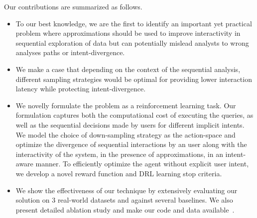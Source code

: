 Our contributions are summarized as follows.
\begin{itemize}
    \item To our best knowledge, we are the first to identify an important yet practical problem where approximations should be used to improve interactivity in sequential exploration of data but can potentially mislead analysts to wrong analyses paths or intent-divergence. 
    \item We make a case that depending on the context of the sequential analysis, different sampling strategies would be optimal for providing lower interaction latency while protecting intent-divergence.   
    \item We novelly formulate the problem as a reinforcement learning task. Our formulation captures both the computational cost of executing the queries, as well as the sequential decisions made by users for different implicit intents. We model the choice of down-sampling strategy as the action-space and optimize the divergence of sequential interactions by an user along with the interactivity of the system, in the presence of approximations, in an intent-aware manner.
    To efficiently optimize the agent without explicit user intent, we develop a novel reward function and DRL learning stop criteria.
    \item We show the effectiveness of our technique by extensively evaluating our solution on 3 real-world datasets and against several baselines. 
    We also present detailed ablation study and make our code and data available~\cite{open_repo}.
    
\end{itemize}

